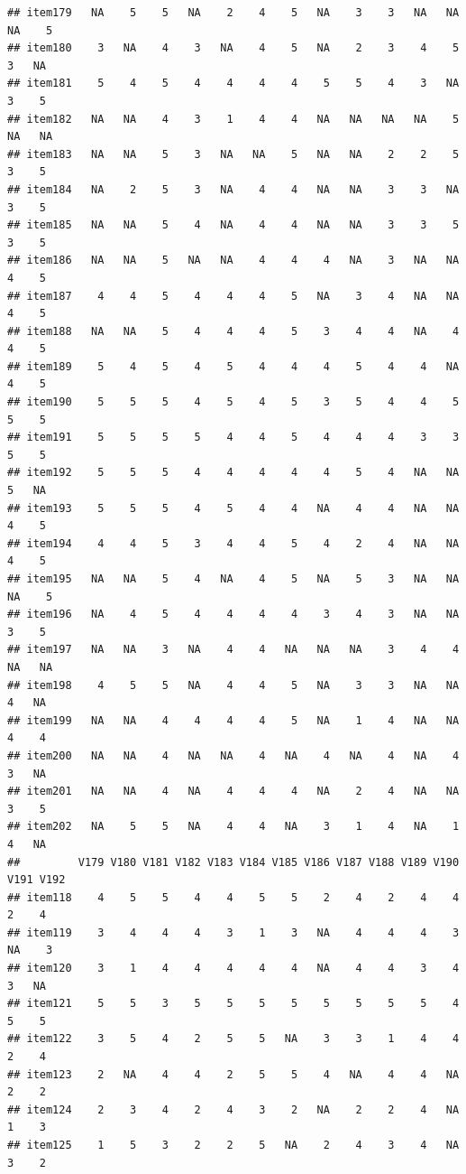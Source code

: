 \documentclass[
  man]{apa6}
\begin{document}
\begin{verbatim}
## item179   NA    5    5   NA    2    4    5   NA    3    3   NA   NA   NA    5
## item180    3   NA    4    3   NA    4    5   NA    2    3    4    5    3   NA
## item181    5    4    5    4    4    4    4    5    5    4    3   NA    3    5
## item182   NA   NA    4    3    1    4    4   NA   NA   NA   NA    5   NA   NA
## item183   NA   NA    5    3   NA   NA    5   NA   NA    2    2    5    3    5
## item184   NA    2    5    3   NA    4    4   NA   NA    3    3   NA    3    5
## item185   NA   NA    5    4   NA    4    4   NA   NA    3    3    5    3    5
## item186   NA   NA    5   NA   NA    4    4    4   NA    3   NA   NA    4    5
## item187    4    4    5    4    4    4    5   NA    3    4   NA   NA    4    5
## item188   NA   NA    5    4    4    4    5    3    4    4   NA    4    4    5
## item189    5    4    5    4    5    4    4    4    5    4    4   NA    4    5
## item190    5    5    5    4    5    4    5    3    5    4    4    5    5    5
## item191    5    5    5    5    4    4    5    4    4    4    3    3    5    5
## item192    5    5    5    4    4    4    4    4    5    4   NA   NA    5   NA
## item193    5    5    5    4    5    4    4   NA    4    4   NA   NA    4    5
## item194    4    4    5    3    4    4    5    4    2    4   NA   NA    4    5
## item195   NA   NA    5    4   NA    4    5   NA    5    3   NA   NA   NA    5
## item196   NA    4    5    4    4    4    4    3    4    3   NA   NA    3    5
## item197   NA   NA    3   NA    4    4   NA   NA   NA    3    4    4   NA   NA
## item198    4    5    5   NA    4    4    5   NA    3    3   NA   NA    4   NA
## item199   NA   NA    4    4    4    4    5   NA    1    4   NA   NA    4    4
## item200   NA   NA    4   NA   NA    4   NA    4   NA    4   NA    4    3   NA
## item201   NA   NA    4   NA    4    4    4   NA    2    4   NA   NA    3    5
## item202   NA    5    5   NA    4    4   NA    3    1    4   NA    1    4   NA
##         V179 V180 V181 V182 V183 V184 V185 V186 V187 V188 V189 V190 V191 V192
## item118    4    5    5    4    4    5    5    2    4    2    4    4    2    4
## item119    3    4    4    4    3    1    3   NA    4    4    4    3   NA    3
## item120    3    1    4    4    4    4    4   NA    4    4    3    4    3   NA
## item121    5    5    3    5    5    5    5    5    5    5    5    4    5    5
## item122    3    5    4    2    5    5   NA    3    3    1    4    4    2    4
## item123    2   NA    4    4    2    5    5    4   NA    4    4   NA    2    2
## item124    2    3    4    2    4    3    2   NA    2    2    4   NA    1    3
## item125    1    5    3    2    2    5   NA    2    4    3    4   NA    3    2

\end{verbatim}
\end{document}
